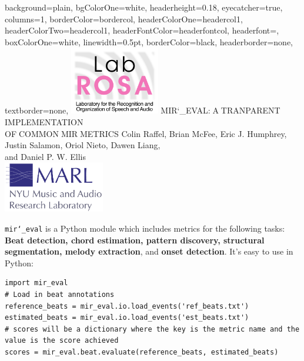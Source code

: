 \documentclass[paperwidth=120cm,paperheight=90cm,portrait,fontscale=.22,margin=5cm,lmargin=.2cm,rmargin=.2cm]{baposter}
\def\mireval{\texttt{mir\char`_eval}}
\begin{document}
\begin{poster}{
  background=plain,
  bgColorOne=white,
  headerheight=0.18\textheight,
  eyecatcher=true,
  columns=1,
  borderColor=bordercol,
  headerColorOne=headercol1,
  headerColorTwo=headercol1,
  headerFontColor=headerfontcol,
  headerfont=\textmd,
  boxColorOne=white,
  linewidth=0.5pt,
  borderColor=black,
  headerborder=none,
  textborder=none,
}
{\includegraphics[height=8em]{labrosa-new-nobg.pdf}}
{\textmd{MIR\char`_EVAL:$\;$A$\;$TRANPARENT$\;$IMPLEMENTATION\\OF$\;$COMMON$\;$MIR$\;$METRICS}}
{Colin Raffel, Brian McFee, Eric J. Humphrey, Justin Salamon, Oriol Nieto, Dawen Liang,\\[.2em] and Daniel P. W. Ellis\\[.2em]}
{\includegraphics[height=6em]{marl-logo.pdf}}

\begin{posterbox}[]{}
\Huge
\mireval{} is a Python module which includes metrics for the following tasks: \textbf{Beat detection, chord estimation, pattern discovery, structural segmentation, melody extraction}, and \textbf{onset detection}.
It's easy to use in Python:
\end{posterbox}

\begin{posterbox}[below=auto]{}

\begin{verbatim}
import mir_eval
# Load in beat annotations
reference_beats = mir_eval.io.load_events('ref_beats.txt')
estimated_beats = mir_eval.io.load_events('est_beats.txt')
# scores will be a dictionary where the key is the metric name and the value is the score achieved
scores = mir_eval.beat.evaluate(reference_beats, estimated_beats)
\end{verbatim}

\end{posterbox}


\end{poster}
\end{document}
